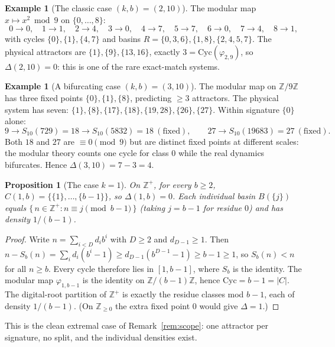 \documentclass[11pt]{article}
\newtheorem{proposition}[theorem]{Proposition}
\theoremstyle{definition}
\newtheorem{example}[theorem]{Example}
\theoremstyle{remark}
\newcommand{\Cyc}{\mathrm{Cyc}}
\begin{document}
\begin{example}[The classic case $(k,b) = (2,10)$]\label{ex:classic}
The modular map $x \mapsto x^2 \bmod 9$ on $\{0,\dots,8\}$:
\[
0\to 0,\quad 1\to 1,\quad 2\to 4,\quad 3\to 0,\quad 4\to 7,\quad 5\to 7,\quad 6\to 0,\quad 7\to 4,\quad 8\to 1,
\]
with cycles $\{0\},\{1\},\{4,7\}$ and basins $R = \{0,3,6\},\{1,8\},\{2,4,5,7\}$. The physical attractors are $\{1\},\{9\},\{13,16\}$, exactly $3 = \Cyc(\varphi_{2,9})$, so $\Delta(2,10) = 0$: this is one of the rare exact-match systems.
\end{example}

\begin{example}[A bifurcating case $(k,b) = (3,10)$]\label{ex:bif}
The modular map on $\mathbb{Z}/9\mathbb{Z}$ has three fixed points $\{0\},\{1\},\{8\}$, predicting $\ge 3$ attractors. The physical system has seven: $\{1\},\{8\},\{17\},\{18\},\{19,28\},\{26\},\{27\}$. Within signature $\{0\}$ alone:
\[
9 \to S_{10}(729) = 18 \to S_{10}(5832) = 18 \ (\text{fixed}), \qquad 27 \to S_{10}(19683) = 27 \ (\text{fixed}).
\]
Both $18$ and $27$ are $\equiv 0 \pmod 9$ but are distinct fixed points at different scales: the modular theory counts one cycle for class $0$ while the real dynamics bifurcates. Hence $\Delta(3,10) = 7 - 3 = 4$.
\end{example}

\begin{proposition}[The case $k=1$]\label{prop:k1}
On $\mathbb{Z}^+$, for every $b\ge 2$, $C(1,b)=\{\{1\},\dots,\{b-1\}\}$, so $\Delta(1,b)=0$. Each individual basin $B(\{j\})$ equals $\{\,n\in\mathbb{Z}^+: n\equiv j\pmod{b-1}\,\}$ (taking $j=b-1$ for residue $0$) and has density $1/(b-1)$.
\end{proposition}

\begin{proof}
Write $n=\sum_{i<D} d_i b^i$ with $D\ge 2$ and $d_{D-1}\ge 1$. Then $n-S_b(n)=\sum_i d_i(b^i-1)\ge d_{D-1}(b^{D-1}-1)\ge b-1\ge 1$, so $S_b(n)<n$ for all $n\ge b$. Every cycle therefore lies in $[1,b-1]$, where $S_b$ is the identity. The modular map $\varphi_{1,b-1}$ is the identity on $\mathbb{Z}/(b-1)\mathbb{Z}$, hence $\Cyc=b-1=|C|$. The digital-root partition of $\mathbb{Z}^+$ is exactly the residue classes mod $b-1$, each of density $1/(b-1)$. (On $\mathbb{Z}_{\ge 0}$ the extra fixed point $0$ would give $\Delta=1$.)
\end{proof}

This is the clean extremal case of Remark~\ref{rem:scope}: one attractor per signature, no split, and the individual densities exist.
\end{document}
